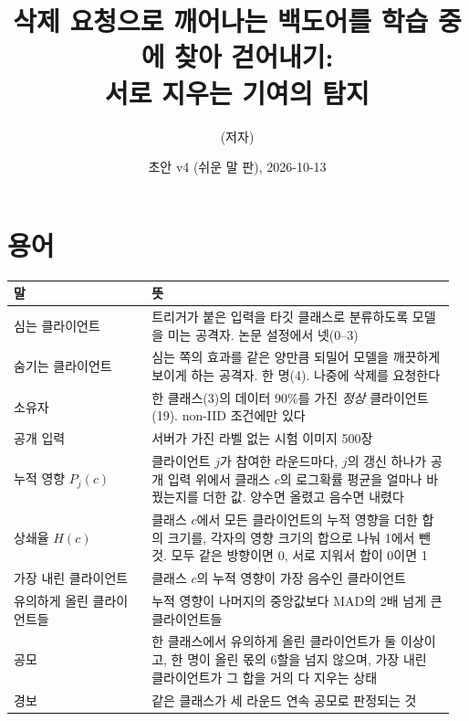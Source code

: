\documentclass[10pt,a4paper]{article}
\title{삭제 요청으로 깨어나는 백도어를 학습 중에 찾아 걷어내기:\\서로 지우는 기여의 탐지}
\author{(저자)}
\date{초안 v4 (쉬운 말 판), 2026-10-13}
\begin{document}
\maketitle

\section*{용어}
\begin{tabular}{p{0.3\linewidth}p{0.66\linewidth}}\toprule
말 & 뜻\\\midrule
심는 클라이언트 & 트리거가 붙은 입력을 타깃 클래스로 분류하도록 모델을 미는 공격자. 논문 설정에서 넷(0--3)\\
숨기는 클라이언트 & 심는 쪽의 효과를 같은 양만큼 되밀어 모델을 깨끗하게 보이게 하는 공격자. 한 명(4). 나중에 삭제를 요청한다\\
소유자 & 한 클래스(3)의 데이터 90\%를 가진 \emph{정상} 클라이언트(19). non-IID 조건에만 있다\\
공개 입력 & 서버가 가진 라벨 없는 시험 이미지 500장\\
누적 영향 $P_j(c)$ & 클라이언트 $j$가 참여한 라운드마다, $j$의 갱신 하나가 공개 입력 위에서 클래스 $c$의 로그확률 평균을 얼마나 바꿨는지를 더한 값. 양수면 올렸고 음수면 내렸다\\
상쇄율 $H(c)$ & 클래스 $c$에서 모든 클라이언트의 누적 영향을 더한 합의 크기를, 각자의 영향 크기의 합으로 나눠 1에서 뺀 것. 모두 같은 방향이면 0, 서로 지워서 합이 0이면 1\\
가장 내린 클라이언트 & 클래스 $c$의 누적 영향이 가장 음수인 클라이언트\\
유의하게 올린 클라이언트들 & 누적 영향이 나머지의 중앙값보다 MAD의 2배 넘게 큰 클라이언트들\\
공모 & 한 클래스에서 유의하게 올린 클라이언트가 둘 이상이고, 한 명이 올린 몫의 6할을 넘지 않으며, 가장 내린 클라이언트가 그 합을 거의 다 지우는 상태\\
경보 & 같은 클래스가 세 라운드 연속 공모로 판정되는 것\\
\bottomrule\end{tabular}
\end{document}
